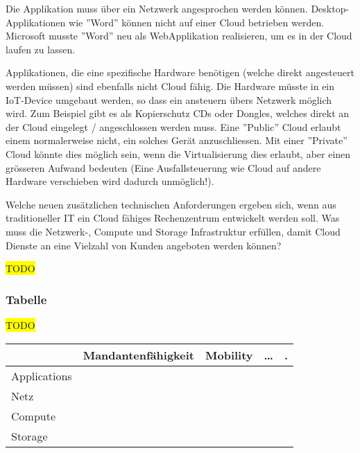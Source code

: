 \documentclass[11pt,titlepage]{article}
\newenvironment{shadedquotation}
 {\begin{shaded*}
  \quoting[leftmargin=0pt, vskip=0pt]
 }
 {\endquoting
 \end{shaded*}
}
\begin{document}
Die Applikation muss über ein Netzwerk angesprochen werden können. Desktop-Applikationen wie ''Word'' können nicht auf einer Cloud betrieben werden.
Microsoft musste ''Word'' neu als WebApplikation realisieren, um es in der Cloud laufen zu lassen.
\par\medskip
Applikationen, die eine spezifische Hardware benötigen (welche direkt angesteuert werden müssen) sind ebenfalls nicht Cloud fähig. Die Hardware müsste in ein IoT-Device umgebaut werden, so dass ein ansteuern übers Netzwerk möglich wird.
Zum Beispiel gibt es als Kopierschutz CDs oder Dongles, welches direkt an der Cloud eingelegt / angeschlossen werden muss. Eine ''Public'' Cloud erlaubt einem normalerweise nicht, ein solches Gerät anzuschliessen.
Mit einer ''Private'' Cloud könnte dies möglich sein, wenn die Virtualisierung dies erlaubt, aber einen grösseren Aufwand bedeuten (Eine Ausfallsteuerung wie Cloud auf andere Hardware verschieben wird dadurch unmöglich!).

\label{sec:Aufgabe-4_technic}
\begin{shadedquotation}
  Welche neuen zusätzlichen technischen Anforderungen ergeben sich, wenn aus traditioneller IT
    ein Cloud fähiges Rechenzentrum entwickelt werden soll. Was muss die Netzwerk-, Compute
    und Storage Infrastruktur erfüllen, damit Cloud Dienste an eine Vielzahl von Kunden angeboten
    werden können?
\end{shadedquotation}
\colorbox{yellow}{TODO}
\subsubsection{Tabelle}
\label{sec:Aufgabe-4_tabelle}
\colorbox{yellow}{TODO}
\begin{tabular}{ |p{2cm}|p{3cm}|p{3cm}|p{3cm}|p{3cm}|  }
  \hline
  & Mandantenfähigkeit & Mobility & … & . \\
  \hline
  Applications & & & & \\
  Netz & & & & \\
  Compute & & & & \\
  Storage & & & & \\
  \hline
\end{tabular}
\end{document}
